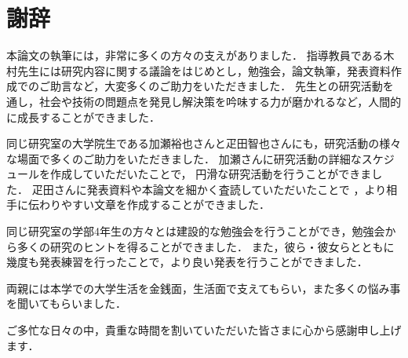 \documentclass[12pt,a4j]{jreport}
\begin{document}


\chapter*{謝辞}

本論文の執筆には，非常に多くの方々の支えがありました．
指導教員である木村先生には研究内容に関する議論をはじめとし，勉強会，論文執筆，発表資料作成でのご助言など，大変多くのご助力をいただきました．
先生との研究活動を通し，社会や技術の問題点を発見し解決策を吟味する力が磨かれるなど，人間的に成長することができました．

同じ研究室の大学院生である加瀬裕也さんと疋田智也さんにも，研究活動の様々な場面で多くのご助力をいただきました．
加瀬さんに研究活動の詳細なスケジュールを作成していただいたことで，
円滑な研究活動を行うことができました．
疋田さんに発表資料や本論文を細かく査読していただいたことで
，より相手に伝わりやすい文章を作成することができました．

同じ研究室の学部4年生の方々とは建設的な勉強会を行うことができ，勉強会から多くの研究のヒントを得ることができました．
また，彼ら・彼女らとともに幾度も発表練習を行ったことで，より良い発表を行うことができました．

両親には本学での大学生活を金銭面，生活面で支えてもらい，また多くの悩み事を聞いてもらいました．

ご多忙な日々の中，貴重な時間を割いていただいた皆さまに心から感謝申し上げます．




\end{document}
